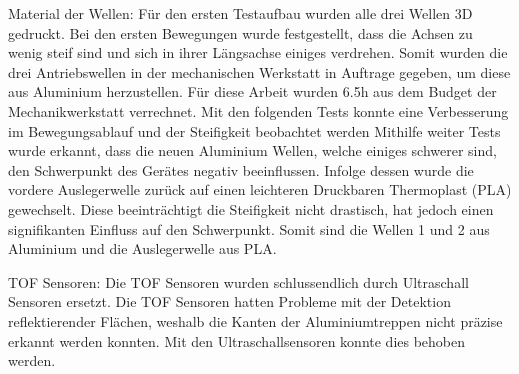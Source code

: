Material der Wellen:
Für den ersten Testaufbau wurden alle drei Wellen 3D gedruckt. Bei den ersten Bewegungen wurde festgestellt, dass die Achsen zu wenig steif sind und sich in ihrer Längsachse einiges verdrehen.
Somit wurden die drei Antriebswellen in der mechanischen Werkstatt in Auftrage gegeben, um diese aus Aluminium herzustellen. Für diese Arbeit wurden 6.5h aus dem Budget der Mechanikwerkstatt verrechnet.
Mit den folgenden Tests konnte eine Verbesserung im Bewegungsablauf und der Steifigkeit beobachtet werden
Mithilfe weiter Tests wurde erkannt, dass die neuen Aluminium Wellen, welche einiges schwerer sind, den Schwerpunkt des Gerätes negativ beeinflussen. Infolge dessen wurde die vordere Auslegerwelle zurück auf einen leichteren Druckbaren Thermoplast (PLA) gewechselt. Diese beeinträchtigt die Steifigkeit nicht drastisch, hat jedoch einen signifikanten Einfluss auf den Schwerpunkt.
Somit sind die Wellen 1 und 2 aus Aluminium und die Auslegerwelle aus PLA.

TOF Sensoren:
Die TOF Sensoren wurden schlussendlich durch Ultraschall Sensoren ersetzt. Die TOF Sensoren hatten Probleme mit der Detektion reflektierender Flächen, weshalb die Kanten der Aluminiumtreppen nicht präzise erkannt werden konnten.
Mit den Ultraschallsensoren konnte dies behoben werden.